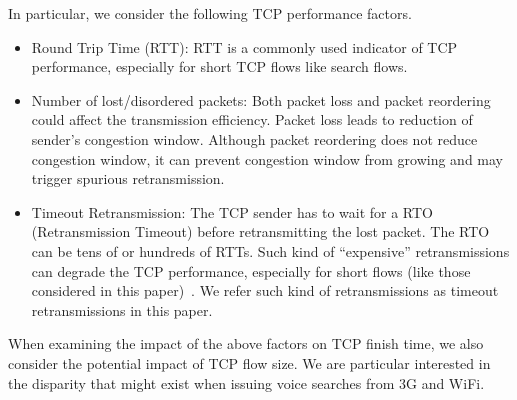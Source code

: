 

In particular, we consider the following TCP performance factors. 

\begin{itemize}
	\item {Round Trip Time (RTT): } RTT is a commonly used indicator of TCP performance, especially for short TCP flows like search flows.
	
	\item {Number of lost/disordered packets: } Both packet loss and packet reordering could affect the transmission efficiency. Packet loss leads to reduction of sender's congestion window. Although packet reordering does not reduce congestion window, it can prevent congestion window from growing and may trigger spurious retransmission. 
	
	\item {Timeout Retransmission: } The TCP sender has to wait for a RTO (Retransmission Timeout) before retransmitting the lost packet. The RTO can be tens of or hundreds of RTTs. Such kind of ``expensive'' retransmissions can degrade the TCP performance, especially for short flows (like those considered in this paper)~\cite{flach2013reducing}. We refer such kind of retransmissions as timeout retransmissions in this paper.

	
\end{itemize}

When examining the impact of the above factors on TCP finish time, we also consider the potential impact of TCP flow size. We are particular interested in the disparity that might exist when issuing voice searches from 3G and WiFi. 